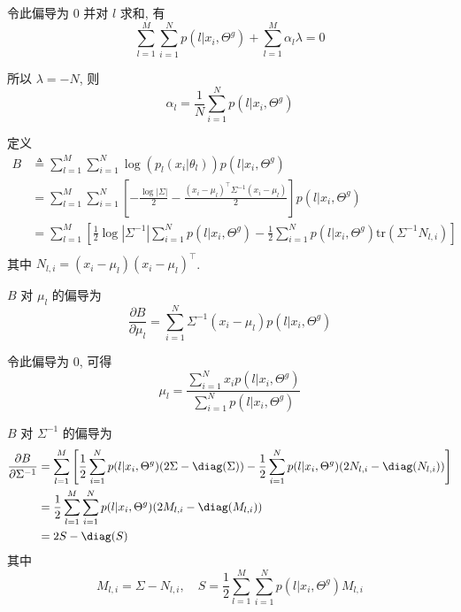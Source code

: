\documentclass[openany]{ctexbook}
\theoremstyle{kaiti}
\theoremstyle{normal}
\begin{document}
令此偏导为 0 并对 $l$ 求和, 有
\begin{equation}
  \sum_{l=1}^M\sum_{i=1}^Np(l|x_i,\Theta^g)+\sum_{l=1}^M\alpha_l\lambda=0
\end{equation}

所以 $\lambda=-N$, 则
\begin{equation}
  \alpha_l=\frac{1}{N}\sum_{i=1}^Np(l|x_i,\Theta^g)
\end{equation}

定义
\begin{equation}
  \begin{aligned}
    B
    &\triangleq\sum_{l=1}^M\sum_{i=1}^N\log(p_l(x_i|\theta_l))p(l|x_i,\Theta^g)\\
    &=\sum_{l=1}^M\sum_{i=1}^N\left[-\frac{\log|\Sigma|}{2}-\frac{(x_i-\mu_l)^{\top}\Sigma^{-1}(x_i-\mu_l)}{2}\right]p(l|x_i,\Theta^g)\\
    &=\sum_{l=1}^M\left[\frac{1}{2}\log|\Sigma^{-1}|\sum_{i=1}^Np(l|x_i,\Theta^g)-\frac{1}{2}\sum_{i=1}^Np(l|x_i,\Theta^g)\mathrm{tr}\left(\Sigma^{-1}N_{l,i}\right)\right]\\
  \end{aligned}
\end{equation}
其中 $N_{l,i}=(x_i-\mu_l)(x_i-\mu_l)^{\top}$.

$B$ 对 $\mu_l$ 的偏导为
\begin{equation}
  \frac{\partial B}{\partial\mu_l}=\sum_{i=1}^N\Sigma^{-1}(x_i-\mu_l)p(l|x_i,\Theta^g)
\end{equation}

令此偏导为 0, 可得
\begin{equation}
  \mu_l=\frac{\displaystyle\sum_{i=1}^Nx_ip(l|x_i,\Theta^g)}{\displaystyle\sum_{i=1}^Np(l|x_i,\Theta^g)}
\end{equation}

$B$ 对 $\Sigma^{-1}$ 的偏导为
\begin{equation}
  \begin{aligned}
    \frac{\partial B}{\partial\Sigma^{-1}}
    &=\sum_{l=1}^M\left[\frac{1}{2}\sum_{i=1}^Np(l|x_i,\Theta^g)(2\Sigma-\diag(\Sigma))-\frac{1}{2}\sum_{i=1}^Np(l|x_i,\Theta^g)(2N_{l,i}-\diag(N_{l,i}))\right]\\
    &=\frac{1}{2}\sum_{l=1}^M\sum_{i=1}^Np(l|x_i,\Theta^g)(2M_{l,i}-\diag(M_{l,i}))\\
    &=2S-\diag(S)
  \end{aligned}
\end{equation}
其中 
\begin{equation}
  M_{l,i}=\Sigma-N_{l,i},\quad S=\frac{1}{2}\sum_{l=1}^M\sum_{i=1}^Np(l|x_i,\Theta^g)M_{l,i}
\end{equation}
\end{document}
